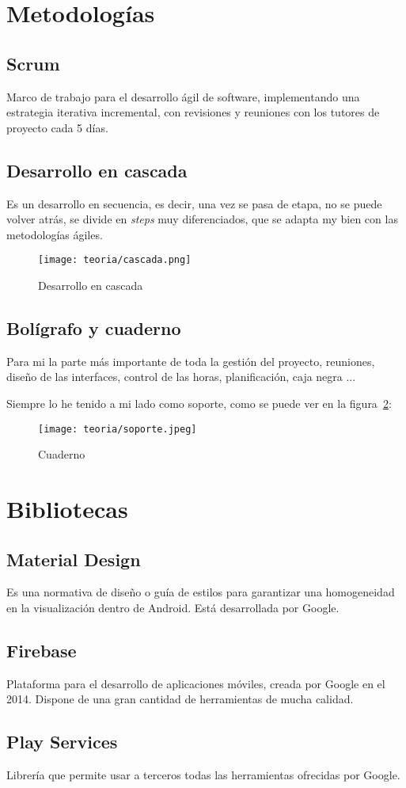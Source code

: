 \section{Metodologías}

\subsection{Scrum}
Marco de trabajo para el desarrollo ágil de software, implementando una estrategia iterativa incremental, con revisiones y reuniones con los tutores de proyecto cada 5 días.

\subsection{Desarrollo en cascada}
Es un desarrollo en secuencia, es decir, una vez se pasa de etapa, no se puede volver atrás, se divide en \emph{steps} muy diferenciados, que se adapta my bien con las metodologías ágiles. 

\begin{figure}[h]
	\centering
	\texttt{[image: teoria/cascada.png]}
	\caption{Desarrollo en cascada}\label{fig:cascada}
\end{figure}

\subsection{Bolígrafo y cuaderno}
Para mi la parte más importante de toda la gestión del proyecto, reuniones, diseño de las interfaces, control de las horas, planificación, caja negra ... 

Siempre lo he tenido a mi lado como soporte, como se puede ver en la figura~\ref{fig:soporte}:

\begin{figure}[h]
	\centering
	\texttt{[image: teoria/soporte.jpeg]}
	\caption{Cuaderno}\label{fig:soporte}
\end{figure}

\section{Bibliotecas}

\subsection{Material Design}
Es una normativa de diseño o guía de estilos para garantizar una homogeneidad en la visualización dentro de Android. Está desarrollada por Google.

\subsection{Firebase}
Plataforma para el desarrollo de aplicaciones móviles, creada por Google en el 2014. Dispone de una gran cantidad de herramientas de mucha calidad.

\subsection{Play Services }
Librería que permite usar a terceros todas las herramientas ofrecidas por Google.





